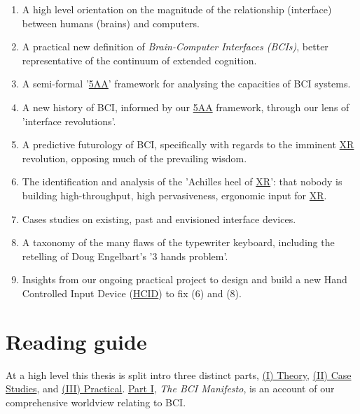 \documentclass[logo,bsc,singlespacing,parskip]{infthesis}
\begin{document}
\begin{enumerate}
\item A high level orientation on the magnitude of the relationship (interface) between humans (brains) and computers.

\item A practical new definition of \emph{Brain-Computer Interfaces (BCIs)}, better representative of the continuum of extended cognition.

\item A semi-formal '\hyperref[orgce96c46]{5AA}' framework for analysing the capacities of BCI systems.

\item A new history of BCI, informed by our \hyperref[orgce96c46]{5AA} framework, through our lens of 'interface revolutions'.

\item A predictive futurology of BCI, specifically with regards to the imminent \hyperref[org53dbe83]{XR} revolution, opposing much of the prevailing wisdom.

\item The identification and analysis of the 'Achilles heel of \hyperref[org53dbe83]{XR}': that nobody is building high-throughput, high pervasiveness, ergonomic input for \hyperref[org53dbe83]{XR}.

\item Cases studies on existing, past and envisioned interface devices.

\item A taxonomy of the many flaws of the typewriter keyboard, including the retelling of Doug Engelbart's '3 hands problem'.

\item Insights from our ongoing practical project to design and build a new Hand Controlled Input Device (\hyperref[org917851e]{HCID}) to fix (6) and (8).
\end{enumerate}

\section*{Reading guide}
\label{sec:org4b39c8a}

At a high level this thesis is split intro three distinct parts, \hyperref[sec:org8312796]{(I) Theory},  \hyperref[sec:org8d4b58d]{(II) Case Studies}, and  \hyperref[sec:orgc716832]{(III) Practical}.
\hyperref[sec:org8312796]{Part I}, \emph{The BCI Manifesto}, is an account of our comprehensive worldview relating to BCI.
\end{document}
